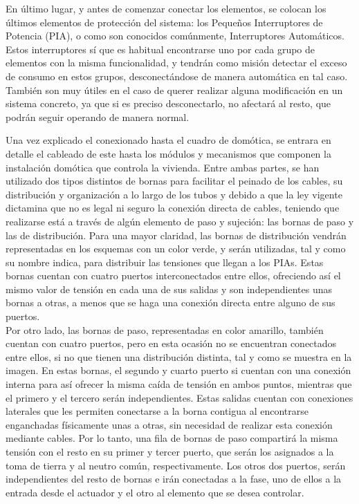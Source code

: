 \begin{itemize}
En último lugar, y antes de comenzar conectar los elementos, se colocan los últimos elementos de protección del sistema: los Pequeños Interruptores de Potencia (PIA), o como son conocidos comúnmente, Interruptores Automáticos. Estos interruptores sí que es habitual encontrarse uno por cada grupo de elementos con la misma funcionalidad, y tendrán como misión detectar el exceso de consumo en estos grupos, desconectándose de manera automática en tal caso. También son muy útiles en el caso de querer realizar alguna modificación en un sistema concreto, ya que si es preciso desconectarlo, no afectará al resto, que podrán seguir operando de manera normal.
\end{itemize} \newpage
Una vez explicado el conexionado hasta el cuadro de domótica, se entrara en detalle el cableado de este hasta los módulos y mecanismos que componen la instalación domótica que controla la vivienda. Entre ambas partes, se han utilizado dos tipos distintos de bornas para facilitar el peinado de los cables, su distribución y organización a lo largo de los tubos y debido a que la ley vigente dictamina que no es legal ni seguro la conexión directa de cables, teniendo que realizarse está a través de algún elemento de paso y sujeción: las bornas de paso y las de distribución. Para una mayor claridad, las bornas de distribución vendrán representadas en los esquemas con un color verde, y serán utilizadas, tal y como su nombre indica, para distribuir las tensiones que llegan a los PIAs. Estas bornas cuentan con cuatro puertos interconectados entre ellos, ofreciendo así el mismo valor de tensión en cada una de sus salidas y son independientes unas bornas a otras, a menos que se haga una conexión directa entre alguno de sus puertos. \\
Por otro lado, las bornas de paso, representadas en color amarillo, también cuentan con cuatro puertos, pero en esta ocasión no se encuentran conectados entre ellos, si no que tienen una distribución distinta, tal y como se muestra en la imagen. En estas bornas, el segundo y cuarto puerto si cuentan con una conexión interna para así ofrecer la misma caída de tensión en ambos puntos, mientras que el primero y el tercero serán independientes. Estas salidas cuentan con conexiones laterales que les permiten conectarse a la borna contigua al encontrarse enganchadas físicamente unas a otras, sin necesidad de realizar esta conexión mediante cables. Por lo tanto, una fila de bornas de paso compartirá la misma tensión con el resto en su primer y tercer puerto, que serán los asignados a la toma de tierra y al neutro común, respectivamente. Los otros dos puertos, serán independientes del resto de bornas e irán conectadas a la fase, uno de ellos a la entrada desde el actuador y el otro al elemento que se desea controlar.

